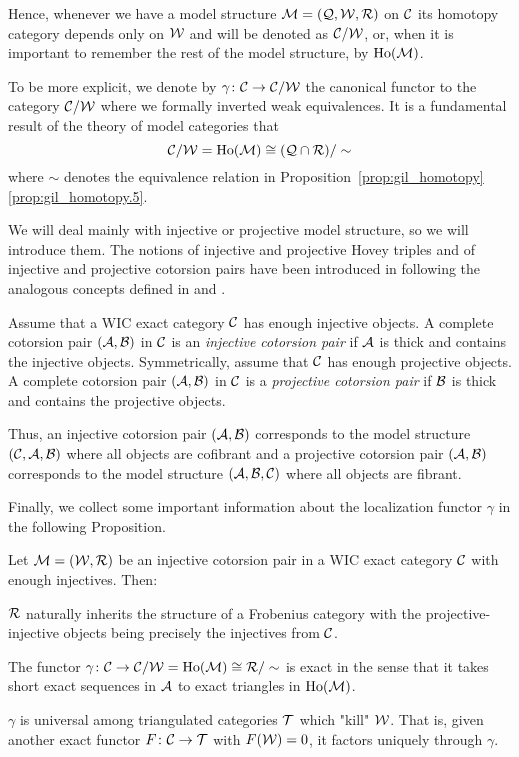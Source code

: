 Hence, whenever we have a model structure $\mathcal{M}=(\mathcal{Q},\mathcal{W},\mathcal{R})$ on $\mathcal{C}$ its homotopy category depends only on $\mathcal{W}$ and will be denoted as $\mathcal{C}/\mathcal{W}$, or, when it is important to remember the rest of the model structure, by $\operatorname{Ho}(\mathcal{M})$.

To be more explicit, we denote by $\gamma\colon\mathcal{C}\to\mathcal{C}/\mathcal{W}$ the canonical functor to the category $\mathcal{C}/\mathcal{W}$ where we formally inverted weak equivalences. It is a fundamental result of the theory of model categories that
\[ \mathcal{C}/\mathcal{W}=\operatorname{Ho}(\mathcal{M})\cong (\mathcal{Q}\cap\mathcal{R})/\sim \]
where $\sim$ denotes the equivalence relation in Proposition~\ref{prop:gil_homotopy}\ref{prop:gil_homotopy.5}.

We will deal mainly with injective or projective model structure, so we will introduce them.
The notions of injective and projective Hovey triples and of injective and projective cotorsion pairs have been introduced in \cite{G7} following the analogous concepts defined in \cite{Beck14} and \cite{G6}.



%
\begin{defn}  Assume that a WIC exact category $\mathcal{C}$ has enough injective objects.
%
A complete cotorsion pair $(\mathcal{A}, \mathcal{B})$ in $\mathcal{C}$ is an \emph{injective cotorsion pair} if $\mathcal{A}$ is thick and contains the injective objects.
Symmetrically, assume that $\mathcal{C}$ has enough projective objects.
%
A complete cotorsion pair $(\mathcal{A}, \mathcal{B})$ in $\mathcal{C}$ is a \emph{projective cotorsion pair} if $\mathcal{B}$ is thick and contains the projective objects.


\end{defn}
%
Thus, an injective cotorsion pair $(\mathcal{A}, \mathcal{B})$ corresponds to the model structure $(\mathcal{C}, \mathcal{A}, \mathcal{B})$ where all objects are cofibrant and a projective cotorsion pair $(\mathcal{A}, \mathcal{B})$ corresponds to the model structure $ (\mathcal{A}, \mathcal{B}, \mathcal{C})$ where all objects are fibrant.

%
%
Finally, we collect some important information about the localization functor $\gamma$ in the following Proposition.

\begin{prop}{\cite[Proposition~3.2]{G7}}
  Let $\mathcal{M}=(\mathcal{W},\mathcal{R})$ be an injective cotorsion pair in a WIC exact category $\mathcal{C}$ with enough injectives. Then:
  \begin{enumerate}
    \item $\mathcal{R}$ naturally inherits the structure of a Frobenius category with the projective-injective objects being precisely the injectives from $\mathcal{C}$.
    \item The functor $\gamma\colon\mathcal{C}\to\mathcal{C}/\mathcal{W}=\operatorname{Ho}(\mathcal{M})\cong {\mathcal{R}/\sim}$ is exact in the sense that it takes short exact sequences in $\mathcal{A}$ to exact triangles in $\operatorname{Ho}(\mathcal{M})$.
  \begin{sloppypar}
    \item $\gamma$ is universal among triangulated categories $\mathcal{T}$ which "kill" $\mathcal{W}$. That is, given another exact functor $F\colon \mathcal{C}\to \mathcal{T}$ with ${F(\mathcal{W})=0}$, it factors uniquely through $\gamma$.
  \end{sloppypar}
  \end{enumerate}
\end{prop}

